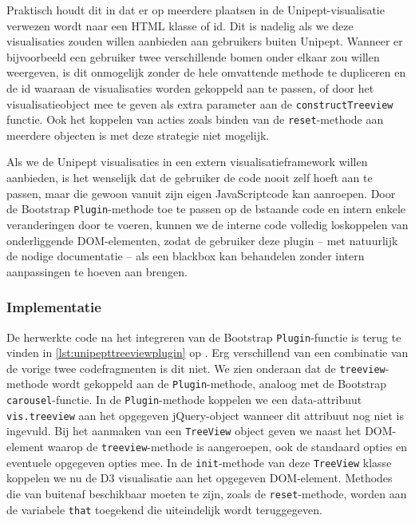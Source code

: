 Praktisch houdt dit in dat er op meerdere plaatsen in de Unipept-visualisatie
verwezen wordt naar een HTML klasse of id. Dit is nadelig als we deze
visualisaties zouden willen aanbieden aan gebruikers buiten Unipept. Wanneer er
bijvoorbeeld een gebruiker twee verschillende bomen onder elkaar zou willen
weergeven, is dit onmogelijk zonder de hele omvattende methode te dupliceren en
de id waaraan de visualisaties worden gekoppeld aan te passen, of door het
visualisatieobject mee te geven als extra parameter aan de
\texttt{constructTreeview} functie. Ook het koppelen van acties zoals binden van
de \texttt{reset}-methode aan meerdere objecten is met deze strategie niet
mogelijk.

Als we de Unipept visualisaties in een extern visualisatieframework willen
aanbieden, is het wenselijk dat de gebruiker de code nooit zelf hoeft aan te
passen, maar die gewoon vanuit zijn eigen JavaScriptcode kan aanroepen. Door de
Bootstrap \texttt{Plugin}-methode toe te passen op de bstaande code en intern
enkele veranderingen door te voeren, kunnen we de interne code volledig
loskoppelen van onderliggende DOM-elementen, zodat de gebruiker deze plugin --
met natuurlijk de nodige documentatie -- als een blackbox kan behandelen zonder
intern aanpassingen te hoeven aan brengen.

\subsubsection{Implementatie}
\label{sec:modenimp}
De herwerkte code na het integreren van de Bootstrap \texttt{Plugin}-functie is
terug te vinden in \autoref{lst:unipepttreeviewplugin} op
. Erg verschillend van een combinatie van
de vorige twee codefragmenten is dit niet. We zien onderaan dat de
\texttt{treeview}-methode wordt gekoppeld aan de \texttt{Plugin}-methode,
analoog met de Bootstrap \texttt{carousel}-functie. In de
\texttt{Plugin}-methode koppelen we een data-attribuut \texttt{vis.treeview} aan
het opgegeven jQuery-object wanneer dit attribuut nog niet is ingevuld. Bij het
aanmaken van een \texttt{TreeView} object geven we naast het DOM-element waarop
de \texttt{treeview}-methode is aangeroepen, ook de standaard opties en
eventuele opgegeven opties mee. In de \texttt{init}-methode van deze
\texttt{TreeView} klasse koppelen we nu de D3 visualisatie aan het opgegeven
DOM-element. Methodes die van buitenaf beschikbaar moeten te zijn, zoals de
\texttt{reset}-methode, worden aan de variabele \texttt{that} toegekend die
uiteindelijk wordt teruggegeven.

